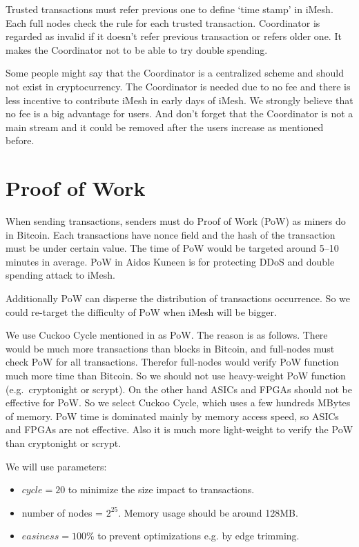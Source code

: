 \documentclass[a4paper,10pt,twocolumn]{article}
\begin{document}
Trusted transactions must refer previous one to define `time stamp' in iMesh.
Each full nodes check the rule for each trusted transaction.
Coordinator is regarded as invalid if it doesn't refer previous transaction or refers older one.
It makes the Coordinator not to be able to try double spending.

Some people might say that the Coordinator is a centralized scheme and should not exist
in cryptocurrency. The Coordinator
is needed due to no fee and there is less incentive to contribute iMesh
in early days of iMesh. We strongly believe that no fee is a big advantage
for users. And don't forget that the Coordinator is not a main stream 
and it could be removed after the users  increase as mentioned before.

\section{Proof of Work}
\label{sec:pow}

When sending transactions, senders must do Proof of Work (PoW) as miners do in Bitcoin.
Each transactions have nonce field
and the hash of the transaction must be under certain value.  The time of PoW would be targeted
around 5--10 minutes in average.
PoW in Aidos Kuneen is for protecting DDoS and double spending attack to iMesh. 

Additionally PoW can disperse the distribution
of transactions occurrence. So we could re-target the difficulty of PoW when iMesh will be bigger.

We use Cuckoo Cycle mentioned in \cite{cuckoo} as PoW. The reason is as follows.
There would be much more transactions than blocks in Bitcoin, and full-nodes
must check PoW for all transactions. Therefor full-nodes would verify
PoW function much more time than Bitcoin. So we should not use heavy-weight PoW function (e.g.\ cryptonight or scrypt).
On the other hand ASICs and FPGAs should not be effective for PoW.
So we select Cuckoo Cycle, which  uses a few hundreds MBytes of memory.
PoW time is dominated mainly by  memory access speed, so ASICs and FPGAs are not effective.
Also it is much more light-weight to verify the PoW than cryptonight or scrypt.

We will use parameters:

\begin{itemize}
	\item \(cycle = 20\) to minimize the size impact to transactions.
    \item number of nodes = \( 2^{25} \). Memory usage should be around 128MB.
    \item \(easiness = 100\% \) to prevent optimizations e.g. by edge trimming.
\end{itemize}
\end{document}
